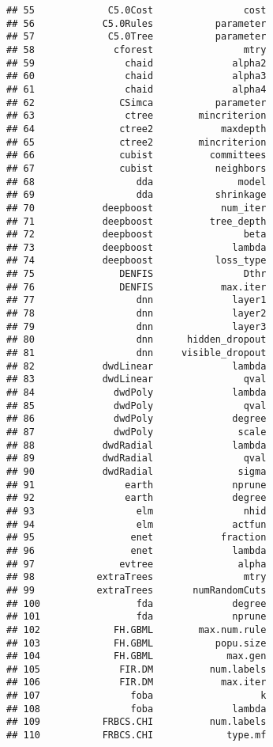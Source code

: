 \documentclass[
]{article}
\begin{document}
\begin{verbatim}
## 55             C5.0Cost                cost
## 56            C5.0Rules           parameter
## 57             C5.0Tree           parameter
## 58              cforest                mtry
## 59                chaid              alpha2
## 60                chaid              alpha3
## 61                chaid              alpha4
## 62               CSimca           parameter
## 63                ctree        mincriterion
## 64               ctree2            maxdepth
## 65               ctree2        mincriterion
## 66               cubist          committees
## 67               cubist           neighbors
## 68                  dda               model
## 69                  dda           shrinkage
## 70            deepboost            num_iter
## 71            deepboost          tree_depth
## 72            deepboost                beta
## 73            deepboost              lambda
## 74            deepboost           loss_type
## 75               DENFIS                Dthr
## 76               DENFIS            max.iter
## 77                  dnn              layer1
## 78                  dnn              layer2
## 79                  dnn              layer3
## 80                  dnn      hidden_dropout
## 81                  dnn     visible_dropout
## 82            dwdLinear              lambda
## 83            dwdLinear                qval
## 84              dwdPoly              lambda
## 85              dwdPoly                qval
## 86              dwdPoly              degree
## 87              dwdPoly               scale
## 88            dwdRadial              lambda
## 89            dwdRadial                qval
## 90            dwdRadial               sigma
## 91                earth              nprune
## 92                earth              degree
## 93                  elm                nhid
## 94                  elm              actfun
## 95                 enet            fraction
## 96                 enet              lambda
## 97               evtree               alpha
## 98           extraTrees                mtry
## 99           extraTrees       numRandomCuts
## 100                 fda              degree
## 101                 fda              nprune
## 102             FH.GBML        max.num.rule
## 103             FH.GBML           popu.size
## 104             FH.GBML             max.gen
## 105              FIR.DM          num.labels
## 106              FIR.DM            max.iter
## 107                foba                   k
## 108                foba              lambda
## 109           FRBCS.CHI          num.labels
## 110           FRBCS.CHI             type.mf

\end{verbatim}
\end{document}
